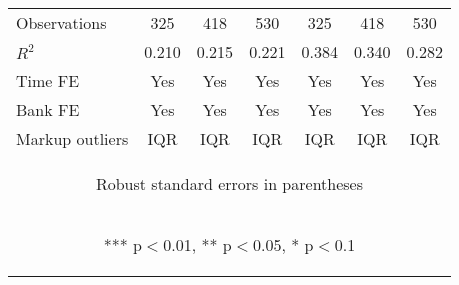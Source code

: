 \documentclass[]{article}
\begin{document}
\begin{center}
\begin{tabular}{lcccccc}
Observations & 325 & 418 & 530 & 325 & 418 & 530 \\
$R^2$ & 0.210 & 0.215 & 0.221 & 0.384 & 0.340 & 0.282 \\
Time FE & Yes & Yes & Yes & Yes & Yes & Yes \\
Bank FE & Yes & Yes & Yes & Yes & Yes & Yes \\
 Markup outliers & IQR & IQR & IQR & IQR & IQR & IQR \\ \hline
\multicolumn{7}{c}{\begin{footnotesize} Robust standard errors in parentheses\end{footnotesize}} \\
\multicolumn{7}{c}{\begin{footnotesize} *** p$<$0.01, ** p$<$0.05, * p$<$0.1\end{footnotesize}} \\
\end{tabular}
\end{center}
\end{document}

